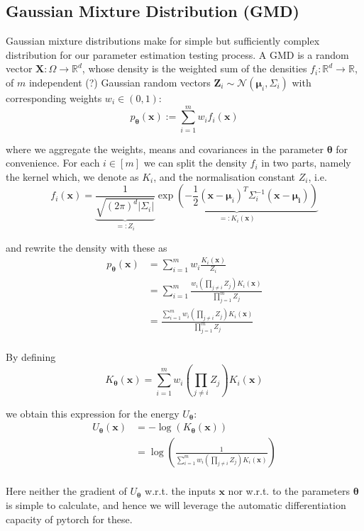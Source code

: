 \subsection{Gaussian Mixture Distribution (GMD)}

Gaussian mixture distributions make for simple but sufficiently complex distribution for our parameter estimation testing process.
A GMD is a random vector  $\bm{X} : \Omega \to \mathbb{R}^d$, whose density is the weighted sum of the densities $f_i : \mathbb{R}^d \to \mathbb{R}$, 
of $m$ independent (?) Gaussian random vectors $\bm{Z}_i \sim \mathcal{N}(\bm{\mu}_i , \Sigma_i )$ with corresponding weights $w_i \in (0, 1)$:
\[
	p_{\bm{\theta}} (\bm{x}) := \sum_{i = 1}^m w_i f_i(\bm{x})
\]

where we aggregate the weights, means and covariances in the parameter $\bm{\theta}$ for convenience.
For each $i \in [m]$ we can split the density $f_i$ in two parts, namely the kernel which, we denote as $K_i$, and the normalisation constant $Z_i$, i.e.
\[
	f_i (\bm{x}) 
	= \underbrace{ \frac{1}{\sqrt{(2\pi)^{d} |\Sigma_i |}} }_{=: Z_i} 
	\underbrace{ \exp \left( - \frac{1}{2} (\bm{x} - \bm{\mu}_i)^T \Sigma_i^{-1} (\bm{x} - \bm{\mu_i}) \right) }_{=: K_i (\bm{x})}
\]

and rewrite the density with these as
\[
\begin{aligned}
	p_{\bm{\theta}} (\bm{x}) 
	&= \sum_{i = 1}^m w_i \frac{K_i(\bm{x})}{Z_i} \\
	&= \sum_{i = 1}^m \frac{ w_i (\prod_{j \neq i} Z_j ) K_i(\bm{x}) }{ \prod_{j = 1}^m Z_j } \\
	&= \frac{ \sum_{i = 1}^m w_i (\prod_{j \neq i} Z_j ) K_i(\bm{x}) }{ \prod_{j = 1}^m Z_j } \\
\end{aligned}
\]

By defining 
\[
	K_{\bm{\theta}} (\bm{x}) = \sum_{i = 1}^m w_i (\prod_{j \neq i} Z_j ) K_i(\bm{x})
\]

we obtain this expression for the energy $U_{\bm{\theta}}$:
\[
\begin{aligned}
	U_{\bm{\theta}} (\bm{x}) 
	&= - \log(K_{\bm{\theta}} (\bm{x}) )  \\
	&= \log( \frac{ 1 }{ \sum_{i = 1}^m w_i (\prod_{j \neq i} Z_j ) K_i(\bm{x})} )\\
\end{aligned}
\]

Here neither the gradient of $U_{\bm{\theta}}$ w.r.t. the inputs $\bm{x}$ nor w.r.t. to the parameters $\bm{\theta}$ is simple to calculate,
and hence we will leverage the automatic differentiation capacity of pytorch for these.





